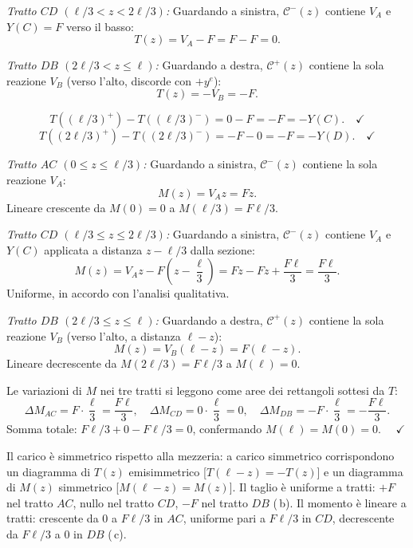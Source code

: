 \begin{esempio}
\begin{svolgimento}
		\textit{Tratto $CD$ $(\ell/3 < z < 2\ell/3)$:}
		Guardando a sinistra, $\mathcal{C}^-(z)$
		contiene $V_A$ e $Y(C) = F$ verso il basso:
		\[
		T(z) = V_A - F = F - F = 0.
		\]
		
		\textit{Tratto $DB$ $(2\ell/3 < z \leq \ell)$:}
		Guardando a destra, $\mathcal{C}^+(z)$
		contiene la sola reazione $V_B$ (verso l'alto,
		discorde con $+y^e$):
		\[
		T(z) = -V_B = -F.
		\]
		
		\[
		T((\ell/3)^+) - T((\ell/3)^-)
		= 0 - F = -F = -Y(C). \quad\checkmark
		\]
		\[
		T((2\ell/3)^+) - T((2\ell/3)^-)
		= -F - 0 = -F = -Y(D). \quad\checkmark
		\]
		
		
		\textit{Tratto $AC$ $(0 \leq z \leq \ell/3)$:}
		Guardando a sinistra, $\mathcal{C}^-(z)$
		contiene la sola reazione $V_A$:
		\[
		M(z) = V_A z = Fz.
		\]
		Lineare crescente da $M(0) = 0$ a
		$M(\ell/3) = F\ell/3$.
		
		\textit{Tratto $CD$ $(\ell/3 \leq z \leq 2\ell/3)$:}
		Guardando a sinistra, $\mathcal{C}^-(z)$
		contiene $V_A$ e $Y(C)$ applicata a distanza
		$z - \ell/3$ dalla sezione:
		\[
		M(z) = V_A z - F\!\left(z - \frac{\ell}{3}\right)
		= Fz - Fz + \frac{F\ell}{3}
		= \frac{F\ell}{3}.
		\]
		Uniforme, in accordo con l'analisi qualitativa.
		
		\textit{Tratto $DB$ $(2\ell/3 \leq z \leq \ell)$:}
		Guardando a destra, $\mathcal{C}^+(z)$
		contiene la sola reazione $V_B$ (verso l'alto,
		a distanza $\ell - z$):
		\[
		M(z) = V_B(\ell - z) = F(\ell - z).
		\]
		Lineare decrescente da $M(2\ell/3) = F\ell/3$
		a $M(\ell) = 0$.
		
		Le variazioni di $M$ nei tre tratti si leggono
		come aree dei rettangoli sottesi da $T$:
		\[
		\Delta M_{AC} = F\cdot\frac{\ell}{3}
		= \frac{F\ell}{3}, \quad
		\Delta M_{CD} = 0\cdot\frac{\ell}{3} = 0, \quad
		\Delta M_{DB} = -F\cdot\frac{\ell}{3}
		= -\frac{F\ell}{3}.
		\]
		Somma totale: $F\ell/3 + 0 - F\ell/3 = 0$,
		confermando $M(\ell) = M(0) = 0$. $\quad\checkmark$
		
		\noindent
		Il carico è simmetrico rispetto alla mezzeria:
		a carico simmetrico corrispondono un diagramma
		di $T(z)$ emisimmetrico [$T(\ell-z) = -T(z)$]
		e un diagramma di $M(z)$ simmetrico
		[$M(\ell-z) = M(z)$]. Il taglio è uniforme a
		tratti: $+F$ nel tratto $AC$, nullo nel tratto
		$CD$, $-F$ nel tratto $DB$ (\,b). Il momento è
		lineare a tratti: crescente da $0$ a $F\ell/3$
		in $AC$, uniforme pari a $F\ell/3$ in $CD$,
		decrescente da $F\ell/3$ a $0$ in $DB$  (\,c).
		
	\end{svolgimento}
\end{esempio}

